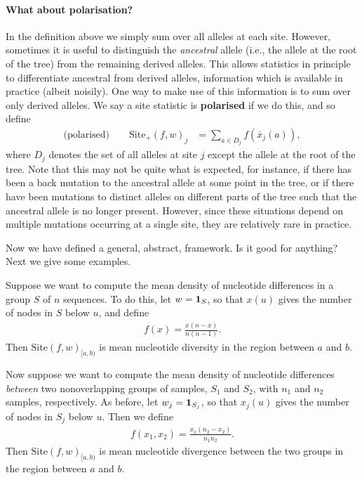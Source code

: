 \documentclass{article}
\newcommand{\site}{\mbox{Site}} %
\newcommand{\sitep}{\mbox{Site}_+} %
\newcommand{\iw}{w} %
\newcommand{\nw}{x} %
\newcommand{\aw}{{\bar x}} %
\begin{document}
\paragraph{What about polarisation?}
In the definition above we simply sum over all alleles at each site.
However, sometimes it is useful to distinguish the \emph{ancestral} allele
(i.e., the allele at the root of the tree) from the remaining derived alleles.
This allows statistics in principle to differentiate ancestral from derived alleles,
information which is available in practice (albeit noisily).
One way to make use of this information is to sum over only derived alleles.
We say a site statistic is \textbf{polarised} if we do this,
and so define
\begin{align} \label{eqn:site_polarised}
    \text{(polarised)} \qquad
    \sitep(f, \iw)_j
    &=
    \sum_{a \in D_j} f(\aw_j(a)) ,
\end{align}
where $D_j$ denotes the set of all alleles at site $j$ except the allele at the root of the tree.
Note that this may not be quite what is expected,
for instance, if there has been a back mutation to the ancestral allele at some point in the tree,
or if there have been mutations to distinct alleles on different parts of the tree
such that the ancestral allele is no longer present.
However, since these situations depend on multiple mutations occurring at a single site,
they are relatively rare in practice.

Now we have defined a general, abstract, framework.
Is it good for anything?
Next we give some examples.

\begin{example} \label{ex:site_diversity}
    Suppose we want to compute the mean density of nucleotide differences
    in a group $S$ of $n$ sequences.
    To do this,
    let $\iw = \bone_S$,
    so that $\nw(u)$ gives the number of nodes in $S$ below $u$,
    and define
    \begin{align*}
        f(x) = \frac{x (n - x)}{n (n-1)} .
    \end{align*}
    Then $\site(f, \iw)_{[a,b)}$ is mean nucleotide diversity in the region between $a$ and $b$.
\end{example}

\begin{example} \label{ex:site_divergence}
    Now suppose we want to compute the mean density of nucleotide differences
    \emph{between} two nonoverlapping groups of samples, $S_1$ and $S_2$,
    with $n_1$ and $n_2$ samples, respectively.
    As before,
    let $\iw_j = \bone_{S_j}$,
    so that $\nw_{j}(u)$ gives the number of nodes in $S_j$ below $u$.
    Then we define
    \begin{align*}
        f(x_1, x_2) = \frac{x_1 (n_2 - x_2)}{n_1 n_2} .
    \end{align*}
    Then $\site(f, \iw)_{[a,b)}$ is mean nucleotide divergence between the two groups
    in the region between $a$ and $b$.
\end{example}
\end{document}

